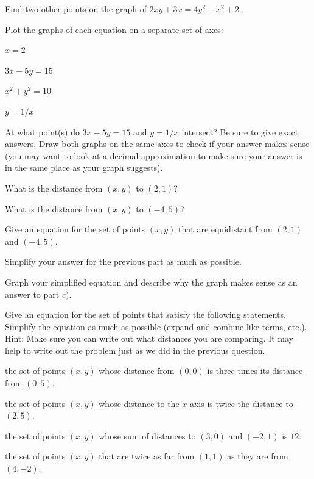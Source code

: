 \bq Find two other points on the graph of $2xy+3x=4y^2-x^2+2$.
\eq

\bq Plot the graphs of each equation on a separate set of axes:
\be
\item $x=2$
\item $3x-5y=15$
\item $x^2+y^2=10$
\item $y=1/x$
\ee
\eq

\bq At what point(s) do $3x-5y=15$ and $y=1/x$ intersect? Be sure to give exact answers. Draw both graphs on the same axes to check if your answer makes sense (you may want to look at a decimal approximation to make sure your answer is in the same place as your graph suggests).
\eq

\bq
\be
\item What is the distance from $(x,y)$ to $(2,1)$?
\item What is the distance from $(x,y)$ to $(-4,5)$?
\item Give an equation for the set of points $(x,y)$ that are equidistant from $(2,1)$ and $(-4,5)$.
\item Simplify your answer for the previous part as much as possible.
\item Graph your simplified equation and describe why the graph makes sense as an answer to part $c)$.
\ee
\eq

\bq Give an equation for the set of points that satisfy the following statements. Simplify the equation as much as possible (expand and combine like terms, etc.). Hint: Make sure you can write out what distances you are comparing. It may help to write out the problem just as we did in the previous question.
\be
\item the set of points $(x,y)$ whose distance from $(0,0)$ is three times its distance from $(0,5)$.
\item the set of points $(x,y)$ whose distance to the $x$-axis is twice the distance to $(2,5)$.
\item the set of points $(x,y)$ whose sum of distances to $(3,0)$ and $(-2,1)$ is $12$.
\item the set of points $(x,y)$ that are twice as far from $(1,1)$ as they are from $(4,-2)$.
\ee
\eq

